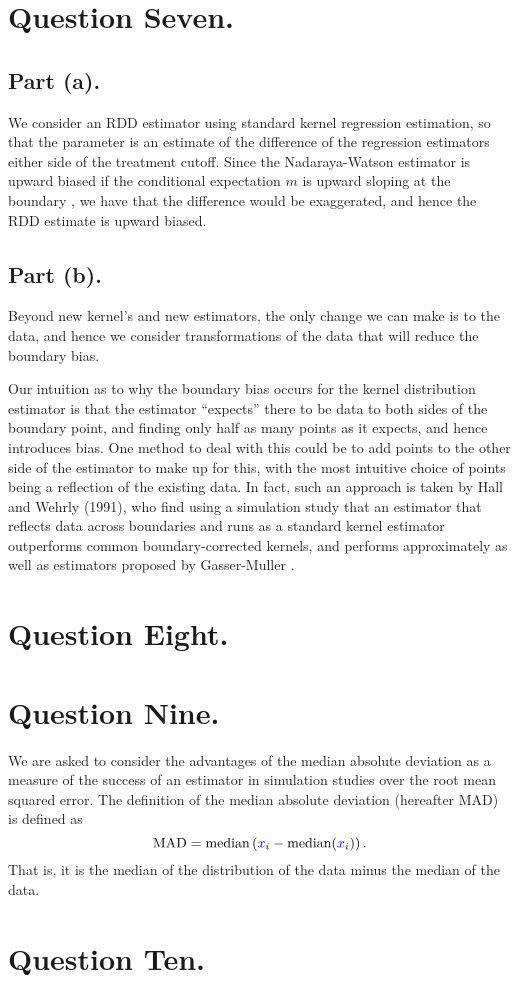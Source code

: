 \documentclass{article}
\renewcommand{\r}[1]{\textcolor{blue}{#1}}
\begin{document}
\section{Question Seven.}
\subsection{Part (a).}
We consider an RDD estimator using standard kernel regression estimation, so that the parameter is an estimate of the difference of the regression estimators either side of the treatment cutoff. Since the Nadaraya-Watson estimator is upward biased if the conditional expectation $m$ is upward sloping at the boundary \cite{racine2001}, we have that the difference would be exaggerated, and hence the RDD estimate is upward biased.

\subsection{Part (b).}
Beyond new kernel's and new estimators, the only change we can make is to the data, and hence we consider transformations of the data that will reduce the boundary bias. 

Our intuition as to why the boundary bias occurs for the kernel distribution estimator is that the estimator ``expects'' there to be data to both sides of the boundary point, and finding only half as many points as it expects, and hence introduces bias. One method to deal with this could be to add points to the other side of the estimator to make up for this, with the most intuitive choice of points being a reflection of the existing data. In fact, such an approach is taken by Hall and Wehrly (1991), who find using a simulation study that an estimator that reflects data across boundaries and runs as a standard kernel estimator outperforms common boundary-corrected kernels, and performs approximately as well as estimators proposed by Gasser-Muller \cite{hall1991}.



\section{Question Eight.}




\section{Question Nine.}
We are asked to consider the advantages of the median absolute deviation as a measure of the success of an estimator in simulation studies over the root mean squared error. The definition of the median absolute deviation (hereafter MAD) is defined\cite{leys2013} as
\begin{equation} \text{MAD} = \text{median}\left(\r{x}_{i}-\text{median}(\r{x}_{i})\right).\end{equation}
That is, it is the median of the distribution of the data minus the median of the data.


\section{Question Ten.}







\end{document}
